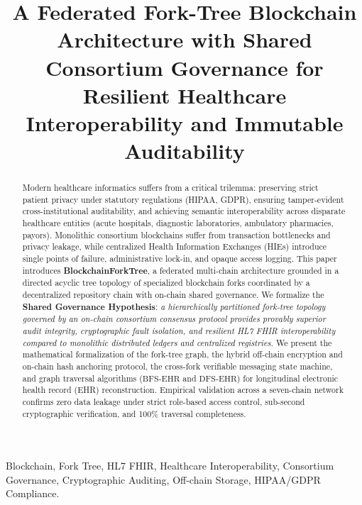 \documentclass[conference]{IEEEtran}
\theoremstyle{definition}
\begin{document}
\title{A Federated Fork-Tree Blockchain Architecture with Shared Consortium Governance for Resilient Healthcare Interoperability and Immutable Auditability}

\author{
}

\maketitle

\begin{abstract}
Modern healthcare informatics suffers from a critical trilemma: preserving strict patient privacy under statutory regulations (HIPAA, GDPR), ensuring tamper-evident cross-institutional auditability, and achieving semantic interoperability across disparate healthcare entities (acute hospitals, diagnostic laboratories, ambulatory pharmacies, payors). Monolithic consortium blockchains suffer from transaction bottlenecks and privacy leakage, while centralized Health Information Exchanges (HIEs) introduce single points of failure, administrative lock-in, and opaque access logging. This paper introduces \textbf{BlockchainForkTree}, a federated multi-chain architecture grounded in a directed acyclic tree topology of specialized blockchain forks coordinated by a decentralized repository chain with on-chain shared governance. We formalize the \textbf{Shared Governance Hypothesis}: \textit{a hierarchically partitioned fork-tree topology governed by an on-chain consortium consensus protocol provides provably superior audit integrity, cryptographic fault isolation, and resilient HL7 FHIR interoperability compared to monolithic distributed ledgers and centralized registries.} We present the mathematical formalization of the fork-tree graph, the hybrid off-chain encryption and on-chain hash anchoring protocol, the cross-fork verifiable messaging state machine, and graph traversal algorithms ($\text{BFS-EHR}$ and $\text{DFS-EHR}$) for longitudinal electronic health record (EHR) reconstruction. Empirical validation across a seven-chain network confirms zero data leakage under strict role-based access control, sub-second cryptographic verification, and 100\% traversal completeness.
\end{abstract}

\begin{IEEEkeywords}
Blockchain, Fork Tree, HL7 FHIR, Healthcare Interoperability, Consortium Governance, Cryptographic Auditing, Off-chain Storage, HIPAA/GDPR Compliance.
\end{IEEEkeywords}
\end{document}
